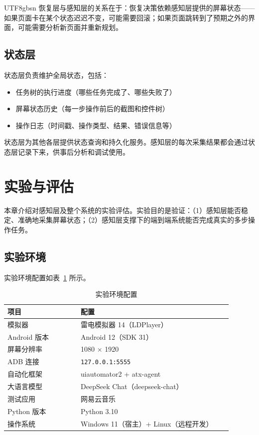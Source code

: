 \documentclass{article}
\begin{document}
\begin{CJK}{UTF8}{gbsn}
恢复层与感知层的关系在于：恢复决策依赖感知层提供的屏幕状态——如果页面卡在某个状态迟迟不变，可能需要回滚；如果页面跳转到了预期之外的界面，可能需要分析新页面并重新规划。

\subsection{状态层}

状态层负责维护全局状态，包括：

\begin{itemize}
  \item 任务树的执行进度（哪些任务完成了、哪些失败了）
  \item 屏幕状态历史（每一步操作前后的截图和控件树）
  \item 操作日志（时间戳、操作类型、结果、错误信息等）
\end{itemize}

状态层为其他各层提供状态查询和持久化服务。感知层的每次采集结果都会通过状态层记录下来，供事后分析和调试使用。

\section{实验与评估}
\label{sec:experiments}

本章介绍对感知层及整个系统的实验评估。实验目的是验证：（1）感知层能否稳定、准确地采集屏幕状态；（2）感知层支撑下的端到端系统能否完成真实的多步操作任务。

\subsection{实验环境}

实验环境配置如表~\ref{tab:test_env} 所示。

\begin{table}[h]
  \centering
  \caption{实验环境配置}
  \label{tab:test_env}
  \begin{tabular}{p{0.3\linewidth}p{0.62\linewidth}}
    \toprule
    项目 & 配置 \\
    \midrule
    模拟器 & 雷电模拟器 14（LDPlayer）\\
    Android 版本 & Android 12（SDK 31）\\
    屏幕分辨率 & 1080 $\times$ 1920 \\
    ADB 连接 & \texttt{127.0.0.1:5555} \\
    自动化框架 & uiautomator2 + atx-agent \\
    大语言模型 & DeepSeek Chat（deepseek-chat）\\
    测试应用 & 网易云音乐 \\
    Python 版本 & Python 3.10 \\
    操作系统 & Windows 11（宿主）+ Linux（远程开发）\\
    \bottomrule
  \end{tabular}
\end{table}


\end{CJK}
\end{document}
